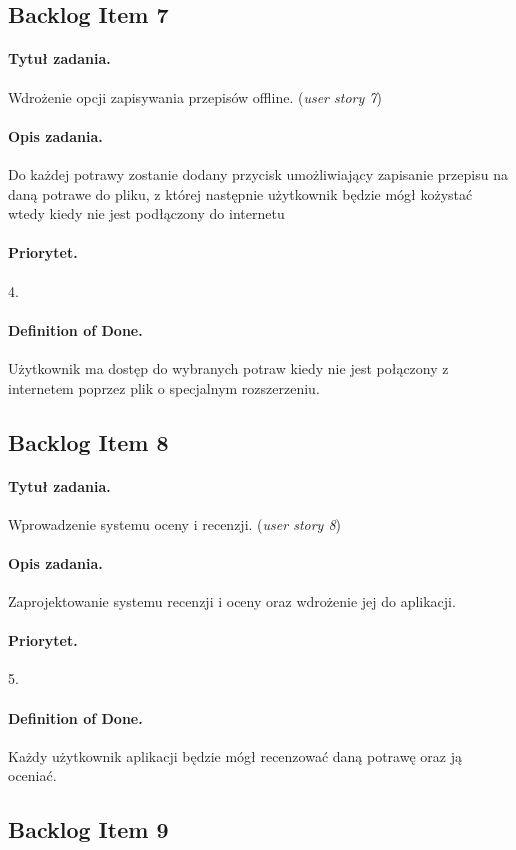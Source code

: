 \documentclass[a4paper]{article}
\begin{document}
\subsection{Backlog Item 7}
\paragraph{Tytuł zadania.} Wdrożenie opcji zapisywania przepisów offline. (\textit{user story 7})
\paragraph{Opis zadania.} Do każdej potrawy zostanie dodany przycisk umożliwiający zapisanie przepisu na daną potrawe do pliku, z której następnie użytkownik będzie mógł kożystać wtedy kiedy nie jest podłączony do internetu
\paragraph{Priorytet.} 4.
\paragraph{Definition of Done.} Użytkownik ma dostęp do wybranych potraw kiedy nie jest połączony z internetem poprzez plik o specjalnym rozszerzeniu.

\subsection{Backlog Item 8}
\paragraph{Tytuł zadania.} Wprowadzenie systemu oceny i recenzji. (\textit{user story 8})
\paragraph{Opis zadania.} Zaprojektowanie systemu recenzji i oceny oraz wdrożenie jej do aplikacji.
\paragraph{Priorytet.} 5.
\paragraph{Definition of Done.} Każdy użytkownik aplikacji będzie mógł recenzować daną potrawę oraz ją oceniać.

\subsection{Backlog Item 9}
\end{document}
